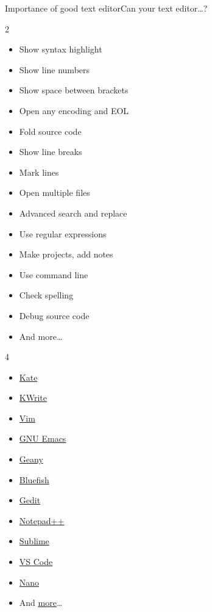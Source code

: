 \documentclass[compress, xelatex, 11pt, xcolor=svgnames, aspectratio=169, url={hyphens, lowtilde}]{beamer}
\begin{document}
\begin{frame}{Importance of good text editor}{Can your text editor\ldots ?}
	\label{editors}
	\begin{multicols}{2}
		\begin{itemize}
			\item Show syntax highlight
			\item Show line numbers
			\item Show space between brackets
			\item Open any encoding and EOL
			\item Fold source code
			\item Show line breaks
			\item Mark lines
			\item Open multiple files
			\item Advanced search and replace
			\item Use regular expressions
			\item Make projects, add notes
			\item Use command line
			\item Check spelling
			\item Debug source code
			\item And more\ldots
		\end{itemize}
	\end{multicols}
	\begin{multicols}{4}
		\begin{itemize}
			\item \href{https://kate-editor.org/}{Kate}
			\item \href{https://apps.kde.org/kwrite}{KWrite}
			\item \href{https://www.vim.org/}{Vim}
			\item \href{https://www.gnu.org/software/emacs/}{GNU Emacs}
			\item \href{https://www.geany.org/}{Geany}
			\item \href{https://bluefish.openoffice.nl/}{Bluefish}
			\item \href{https://gedit-text-editor.org/}{Gedit}
			\item \href{https://notepad-plus-plus.org/}{Notepad++}
			\item \href{https://www.sublimetext.com/}{Sublime}
			\item \href{https://code.visualstudio.com/}{VS Code}
			\item \href{https://www.nano-editor.org/}{Nano}
			\item And \href{https://en.wikipedia.org/wiki/List_of_text_editors}{more}\ldots
		\end{itemize}
	\end{multicols}
\end{frame}
\end{document}
